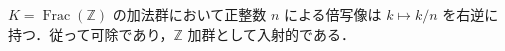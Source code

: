 \begin{prop}[分数体の加法群の入射性]
$K=\operatorname{Frac}(\mathbb Z)$ の加法群において正整数 $n$ による倍写像は $k\mapsto k/n$ を右逆に持つ．従って可除であり，$\mathbb Z$ 加群として入射的である．
\end{prop}
